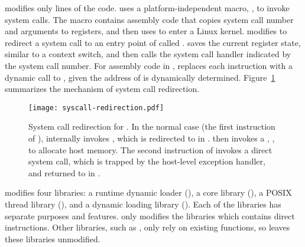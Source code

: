 \graphene{} modifies only \gipclines{} lines of the \glibc{} code.
\glibc{} uses a platform-independent macro,
,
to invoke system calls.
The macro  contains assembly code
that copies system call number and arguments to registers,
and then uses  to enter a Linux kernel.
\graphene{} modifies 
to redirect a system call to
an entry point of \thelibos{} called .
 saves the current register state, similar to a context switch,
and then
calls the system call handler
indicated by the system call number.
For assembly code in \glibc{},
\graphene{} replaces each  instruction with
a dynamic call to
, given the address of  is dynamically determined.
Figure~\ref{fig:libos:syscall-redirection} summarizes the mechanism of system call redirection.


\begin{figure}[t!]
\centering
\texttt{[image: syscall-redirection.pdf]}
\footnotesize
\caption{System call redirection for \thelibos{}.
In the normal case (the first instruction of ),  internally invokes 
, which is redirected to  in \thelibos{}.\thelibos{} then invokes a \hostapi{}, , to allocate host memory. The second instruction of  invokes a direct system call, which is trapped by the host-level exception handler,
and returned to  in \thelibos{}.}
\label{fig:libos:syscall-redirection}
\end{figure}


\graphene{} modifies four \glibc{} libraries:
a runtime dynamic loader (), a core library (), a POSIX thread library (\libpthread{}), and a dynamic loading library (\libdl{}).
Each of the \Glibc{} libraries has separate purposes and features.
\graphene{} only modifies the \glibc{} libraries which contains direct  instructions.
Other libraries, such as ,
only rely on 
existing \libc{} functions,
so \graphene{} leaves these libraries unmodified.



